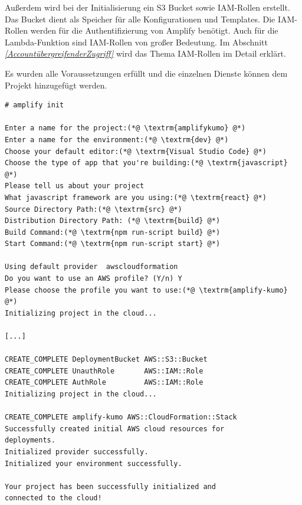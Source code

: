 Außerdem wird bei der Initialisierung ein S3 Bucket sowie IAM-Rollen erstellt.
Das Bucket dient als Speicher für alle Konfigurationen und Templates.
Die IAM-Rollen werden für die Authentifizierung von Amplify benötigt.
Auch für die Lambda-Funktion sind IAM-Rollen von großer Bedeutung.
Im Abschnitt \textit{\ref{AccountübergreifenderZugriff} } wird das Thema IAM-Rollen im Detail erklärt.

Es wurden alle Voraussetzungen erfüllt und die einzelnen Dienste können dem Projekt hinzugefügt werden.

\begin{lstlisting}[basicstyle=\ttfamily\small, breaklines=true , frame = single, backgroundcolor=\color{flashwhite} ]
# amplify init

Enter a name for the project:(*@ \textrm{amplifykumo} @*)
Enter a name for the environment:(*@ \textrm{dev} @*)
Choose your default editor:(*@ \textrm{Visual Studio Code} @*)
Choose the type of app that you're building:(*@ \textrm{javascript} @*)
Please tell us about your project
What javascript framework are you using:(*@ \textrm{react} @*)
Source Directory Path:(*@ \textrm{src} @*)
Distribution Directory Path: (*@ \textrm{build} @*)
Build Command:(*@ \textrm{npm run-script build} @*)
Start Command:(*@ \textrm{npm run-script start} @*)

Using default provider  awscloudformation
Do you want to use an AWS profile? (Y/n) Y
Please choose the profile you want to use:(*@ \textrm{amplify-kumo} @*)
Initializing project in the cloud...

[...]

CREATE_COMPLETE DeploymentBucket AWS::S3::Bucket
CREATE_COMPLETE UnauthRole       AWS::IAM::Role
CREATE_COMPLETE AuthRole         AWS::IAM::Role
Initializing project in the cloud...

CREATE_COMPLETE amplify-kumo AWS::CloudFormation::Stack
Successfully created initial AWS cloud resources for
deployments.
Initialized provider successfully.
Initialized your environment successfully.

Your project has been successfully initialized and
connected to the cloud!

\end{lstlisting}


